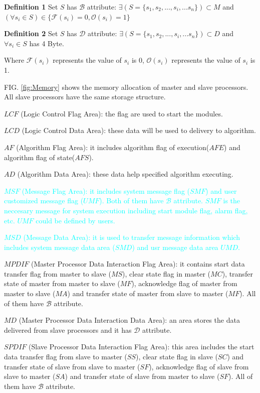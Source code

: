 \documentclass[journal,UTF8]{IEEEtran}
\begin{document}
\textbf{Definition 1} Set $S$ has $\mathcal{B}$ attribute: $\exists (S=\{s_1,s_2,...,s_i,...s_n\}) \subset M$ and $(\forall s_{i} \in S) \in \{\mathcal{F}(s_i) = 0,\mathcal{O}(s_i) = 1\} $

\textbf{Definition 2} Set $S$ has $\mathcal{D}$ attribute: $\exists (S=\{s_1,s_2,...,s_i,...s_n\}) \subset D$ and $\forall s_{i} \in S$ has 4 Byte.

Where $\mathcal{F}(s_i)$ represents the value of $s_i$ is 0, $\mathcal{O}(s_i)$ represents the value of $s_i$ is 1.

FIG. \ref{fig:Memory} shows the memory allocation of master and slave processors. All slave processors have the same storage structure.

\textbf{$LCF$} (Logic Control Flag Area): the flag are used to start the modules.

\textbf{$LCD$} (Logic Control Data Area): these data will be used to delivery to algorithm.

\textbf{$AF$} (Algorithm Flag Area): it includes algorithm flag of execution($AFE$) and algorithm flag of state($AFS$).

\textbf{$AD$} (Algorithm Data Area): these data help specified algorithm executing.

\textcolor{cyan}{\textbf{$MSF$} (Message Flag Area): it includes system message flag ($SMF$) and user customized message flag ($UMF$). Both of them have $\mathcal{B}$ attribute. $SMF$ is the neccesary message for system execution including start module flag, alarm flag, etc. $UMF$ could be defined by users.}

\textcolor{cyan}{\textbf{$MSD$} (Message Data Area): it is used to transfer message information which includes system message data area ($SMD$) and usr message data area $UMD$.}

\textbf{$MPDIF$} (Master Processor Data Interaction Flag Area): it contains start data transfer flag from master to slave ($MS$), clear state flag in master ($MC$), transfer state of master from master to slave ($MF$), acknowledge flag of master from master to slave ($MA$) and transfer state of master from slave to master ($MF$). All of them have $\mathcal{B}$ attribute.

\textbf{$MD$} (Master Processor Data Interaction Data Area): an area stores the data delivered from slave processors and it has $\mathcal{D}$ attribute.

\textbf{$SPDIF$} (Slave Processor Data Interaction Flag Area): this area includes the start data transfer flag from slave to master ($SS$), clear state flag in slave ($SC$) and transfer state of slave from slave to master ($SF$), acknowledge flag of slave from slave to master ($SA$) and transfer state of slave from master to slave ($SF$). All of them have $\mathcal{B}$ attribute.
\end{document}
